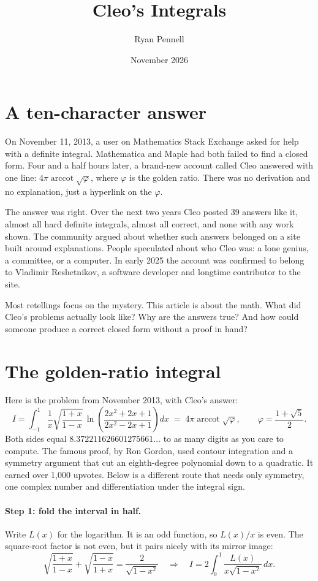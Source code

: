 \documentclass[11pt]{article}
\title{Cleo's Integrals}
\author{Ryan Pennell}
\date{November 2026}
\DeclareMathOperator{\arccot}{arccot}
\begin{document}
\maketitle

\section*{A ten-character answer}

On November 11, 2013, a user on Mathematics Stack Exchange asked for help with a definite integral. Mathematica and Maple had both failed to find a closed form. Four and a half hours later, a brand-new account called Cleo answered with one line: $4\pi\arccot\sqrt{\varphi}$, where $\varphi$ is the golden ratio. There was no derivation and no explanation, just a hyperlink on the $\varphi$.

The answer was right. Over the next two years Cleo posted 39 answers like it, almost all hard definite integrals, almost all correct, and none with any work shown. The community argued about whether such answers belonged on a site built around explanations. People speculated about who Cleo was: a lone genius, a committee, or a computer. In early 2025 the account was confirmed to belong to Vladimir Reshetnikov, a software developer and longtime contributor to the site.

Most retellings focus on the mystery. This article is about the math. What did Cleo's problems actually look like? Why are the answers true? And how could someone produce a correct closed form without a proof in hand?

\section*{The golden-ratio integral}

Here is the problem from November 2013, with Cleo's answer:
\[
I=\int_{-1}^{1}\frac{1}{x}\sqrt{\frac{1+x}{1-x}}\,\ln\!\left(\frac{2x^2+2x+1}{2x^2-2x+1}\right)dx
\;=\; 4\pi\arccot\sqrt{\varphi},\qquad \varphi=\frac{1+\sqrt5}{2}.
\]
Both sides equal $8.372211626601275661\ldots$ to as many digits as you care to compute. The famous proof, by Ron Gordon, used contour integration and a symmetry argument that cut an eighth-degree polynomial down to a quadratic. It earned over 1,000 upvotes. Below is a different route that needs only symmetry, one complex number and differentiation under the integral sign.

\paragraph{Step 1: fold the interval in half.} Write $L(x)$ for the logarithm. It is an odd function, so $L(x)/x$ is even. The square-root factor is not even, but it pairs nicely with its mirror image:
\[
\sqrt{\frac{1+x}{1-x}}+\sqrt{\frac{1-x}{1+x}}=\frac{2}{\sqrt{1-x^2}}
\quad\Longrightarrow\quad
I=2\int_0^1\frac{L(x)}{x\sqrt{1-x^2}}\,dx.
\]
\end{document}

